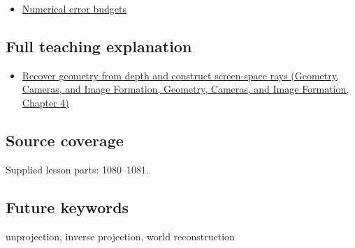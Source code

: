 \begin{itemize}
\tightlist
\item
  \hyperref[appendix-31b8c295e05f]{Numerical error budgets}
\end{itemize}

\subsection{Full teaching explanation}\label{appendix-2cbf2968e866-full-teaching-explanation}

\begin{itemize}
\tightlist
\item
  \href{../03-Geometry-Cameras-and-Image-Formation/main.pdf\#nameddest=02-foundations-ii-ch035-recover-geometry-from-depth-and-construct-screen-space-rays}{Recover geometry from depth and construct screen-space rays (Geometry, Cameras, and Image Formation, Geometry, Cameras, and Image Formation, Chapter 4)}
\end{itemize}

\subsection{Source coverage}\label{appendix-2cbf2968e866-source-coverage}

Supplied lesson parts: 1080--1081.

\subsection{Future keywords}\label{appendix-2cbf2968e866-future-keywords}

unprojection, inverse projection, world reconstruction

